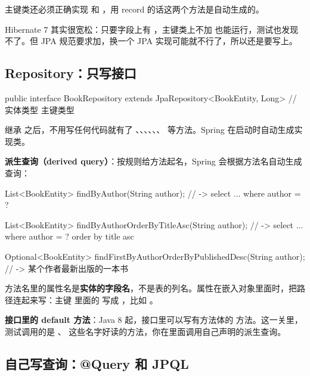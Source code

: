 主键类还必须正确实现  和 ，用 record 的话这两个方法是自动生成的。

\begin{note}
Hibernate 7 其实很宽松：只要字段上有 ，主键类上不加  也能运行，测试也发现不了。但 JPA 规范要求加，换一个 JPA 实现可能就不行了，所以还是要写上。
\end{note}

\subsection{Repository：只写接口}

\begin{java}
public interface BookRepository extends JpaRepository<BookEntity, Long> {
    //                                               实体类型    主键类型
}
\end{java}

继承  之后，不用写任何代码就有了 、、、、、、 等方法。Spring 在启动时自动生成实现类。

\textbf{派生查询（derived query）}：按规则给方法起名，Spring 会根据方法名自动生成查询：

\begin{java}
List<BookEntity> findByAuthor(String author);
// -> select ... where author = ?

List<BookEntity> findByAuthorOrderByTitleAsc(String author);
// -> select ... where author = ? order by title asc

Optional<BookEntity> findFirstByAuthorOrderByPublishedDesc(String author);
// -> 某个作者最新出版的一本书
\end{java}

方法名里的属性名是\textbf{实体的字段名}，不是表的列名。属性在嵌入对象里面时，把路径连起来写：主键  里面的  写成 ，比如 。

\textbf{接口里的 default 方法}：Java 8 起，接口里可以写有方法体的  方法。这一关里，测试调用的是 、 这些名字好读的方法，你在里面调用自己声明的派生查询。

\subsection{自己写查询：@Query 和 JPQL}

